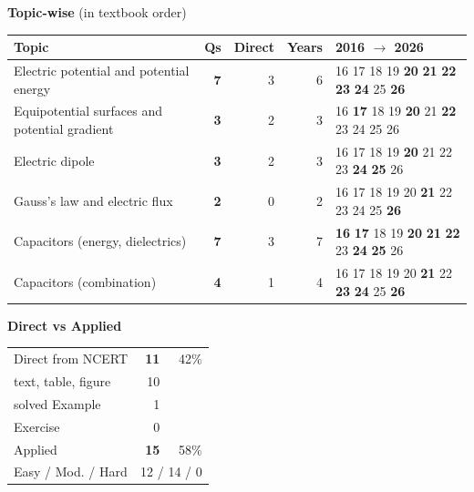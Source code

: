 {\small\textbf{\color{crimson}Topic-wise} (in textbook order)\par\smallskip
\begin{tabularx}{\linewidth}{@{}>{\raggedright\arraybackslash}Xrrrl@{}}\toprule
Topic & Qs & Direct & Years & 2016 $\rightarrow$ 2026\\\midrule
Electric potential and potential energy & \textbf{7} & 3 & 6 & {\scriptsize {\color{gray!45}16} {\color{gray!45}17} {\color{gray!45}18} {\color{gray!45}19} \textbf{20} \textbf{21} \textbf{22} \textbf{23} \textbf{24} {\color{gray!45}25} \textbf{26}}\\
Equipotential surfaces and potential gradient & \textbf{3} & 2 & 3 & {\scriptsize {\color{gray!45}16} \textbf{17} {\color{gray!45}18} {\color{gray!45}19} \textbf{20} {\color{gray!45}21} \textbf{22} {\color{gray!45}23} {\color{gray!45}24} {\color{gray!45}25} {\color{gray!45}26}}\\
Electric dipole & \textbf{3} & 2 & 3 & {\scriptsize {\color{gray!45}16} {\color{gray!45}17} {\color{gray!45}18} {\color{gray!45}19} \textbf{20} {\color{gray!45}21} {\color{gray!45}22} {\color{gray!45}23} \textbf{24} \textbf{25} {\color{gray!45}26}}\\
Gauss's law and electric flux & \textbf{2} & 0 & 2 & {\scriptsize {\color{gray!45}16} {\color{gray!45}17} {\color{gray!45}18} {\color{gray!45}19} {\color{gray!45}20} \textbf{21} {\color{gray!45}22} {\color{gray!45}23} {\color{gray!45}24} {\color{gray!45}25} \textbf{26}}\\
Capacitors (energy, dielectrics) & \textbf{7} & 3 & 7 & {\scriptsize \textbf{16} \textbf{17} {\color{gray!45}18} {\color{gray!45}19} \textbf{20} \textbf{21} \textbf{22} {\color{gray!45}23} \textbf{24} \textbf{25} {\color{gray!45}26}}\\
Capacitors (combination) & \textbf{4} & 1 & 4 & {\scriptsize {\color{gray!45}16} {\color{gray!45}17} {\color{gray!45}18} {\color{gray!45}19} {\color{gray!45}20} \textbf{21} {\color{gray!45}22} \textbf{23} \textbf{24} {\color{gray!45}25} \textbf{26}}\\
\bottomrule\end{tabularx}}\par\medskip
\begin{minipage}[t]{0.34\linewidth}{\small\textbf{\color{crimson}Direct vs Applied}\par\smallskip
\begin{tabular}{@{}lrr@{}}\toprule
Direct from NCERT & \textbf{11} & 42\%\\
\quad text, table, figure & 10 &\\
\quad solved Example & 1 &\\
\quad Exercise & 0 &\\
Applied & \textbf{15} & 58\%\\\midrule
Easy / Mod. / Hard & \multicolumn{2}{r}{12 / 14 / 0}\\\bottomrule
\end{tabular}}\end{minipage}\hfill
